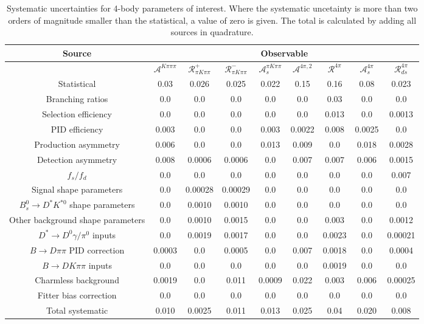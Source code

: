 \begin{sidewaystable}
  \centering
  \begin{tabular}{ccccccccc}
      \toprule
      Source & \multicolumn{8}{c}{Observable} \\
      \midrule
       & $\mathcal{A}^{K\pi\pi\pi}$ & $\mathcal{R}_{\pi K\pi\pi}^+$ & $\mathcal{R}_{\pi K\pi\pi}^-$ & $\mathcal{A}_s^{\pi K\pi\pi}$ & $\mathcal{A}^{4\pi,2}$ & $\mathcal{R}^{4\pi}$ & $\mathcal{A}_s^{4\pi}$ & $\mathcal{R}_{ds}^{4\pi}$ \\
      \midrule
      Statistical & 0.03 & 0.026 & 0.025 & 0.022 & 0.15 & 0.16 & 0.08 & 0.023 \\
      \midrule
      Branching ratios & 0.0  & 0.0  & 0.0  & 0.0  & 0.0  & 0.03 & 0.0  & 0.0  \\
      Selection efficiency & 0.0  & 0.0  & 0.0  & 0.0  & 0.0  & 0.013 & 0.0  & 0.0013 \\
      PID efficiency & 0.003 & 0.0  & 0.0  & 0.003 & 0.0022 & 0.008 & 0.0025 & 0.0  \\
      Production asymmetry & 0.006 & 0.0  & 0.0  & 0.013 & 0.009 & 0.0  & 0.018 & 0.0028 \\
      Detection asymmetry & 0.008 & 0.0006 & 0.0006 & 0.0  & 0.007 & 0.007 & 0.006 & 0.0015 \\
      $f_s/f_d$ & 0.0  & 0.0  & 0.0  & 0.0  & 0.0  & 0.0  & 0.0  & 0.007 \\
      Signal shape parameters & 0.0  & 0.00028 & 0.00029 & 0.0  & 0.0  & 0.0  & 0.0  & 0.0  \\
      $B^0_s \to D^* K^{*0}$ shape parameters & 0.0  & 0.0010 & 0.0010 & 0.0  & 0.0  & 0.0  & 0.0  & 0.0  \\
      Other background shape parameters & 0.0  & 0.0010 & 0.0015 & 0.0  & 0.0  & 0.003 & 0.0  & 0.0012 \\
      $D^* \to D^0 \gamma/\pi^0$ inputs & 0.0  & 0.0019 & 0.0017 & 0.0  & 0.0  & 0.0023 & 0.0  & 0.00021 \\
      $B\to D\pi\pi$ PID correction & 0.0003 & 0.0  & 0.0005 & 0.0  & 0.007 & 0.0018 & 0.0  & 0.0004 \\
      $B\to DK\pi\pi$ inputs & 0.0  & 0.0  & 0.0  & 0.0  & 0.0  & 0.0019 & 0.0  & 0.0  \\
      Charmless background & 0.0019 & 0.0  & 0.011 & 0.0009 & 0.022 & 0.003 & 0.006 & 0.00025 \\
      Fitter bias correction & 0.0  & 0.0  & 0.0  & 0.0  & 0.0  & 0.0  & 0.0  & 0.0  \\
      \midrule
      Total systematic & 0.010 & 0.0025 & 0.011 & 0.013 & 0.025 & 0.04 & 0.020 & 0.008 \\
      \bottomrule
  \end{tabular}
  \caption{Systematic uncertainties for 4-body parameters of interest. Where the systematic uncetainty is more than two orders of magnitude smaller than the statistical, a value of zero is given. The total is calculated by adding all sources in quadrature.}
\label{tab:fourBody_systematics}
\end{sidewaystable}
